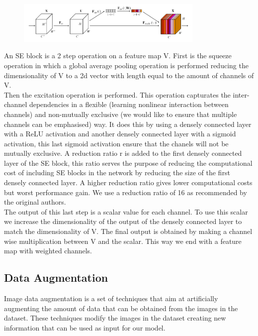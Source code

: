 \documentclass[runningheads,a4paper]{llncs}
\begin{document}
\begin{figure}[H]
    \centering
    \includegraphics[width=0.8\textwidth]{background/se.png}
    \caption{}
    \label{figure:background:se}
\end{figure}

An SE block is a 2 step operation on a feature map V. First is the squeeze operation in which a global average pooling operation is performed reducing the dimensionality of V to a 2d vector with length equal to the amount of channels of V. \\

Then the excitation operation is performed. This operation capturates the inter-channel dependencies in a flexible (learning nonlinear interaction between channels) and non-mutually exclusive (we would like to ensure that multiple channels can be emphasised) way. It does this by using a densely connected layer with a ReLU activation and another densely connected layer with a sigmoid activation, this last sigmoid activation ensure that the chanels will not be mutually exclusive. A reduction ratio r is added to the first densely connected layer of the SE block, this ratio serves the purpose of reducing the computational cost of including SE blocks in the network by reducing the size of the first densely connected layer. A higher reduction ratio gives lower computational costs but worst performance gain. We use a reduction ratio of 16 as recommended by the original authors. \\

The output of this last step is a scalar value for each channel. To use this scalar we increase the dimensionality of the output of the densely connected layer to match the dimensionality of V. The final output is obtained by making a channel wise multiplication between V and the scalar. This way we end with a feature map with weighted channels.

\subsection{Data Augmentation}

Image data augmentation is a set of techniques that aim at artificially augmenting the amount of data that can be obtained from the images in the dataset.  These techniques modify the images in the dataset creating new information that can be used as input for our model. \\
\end{document}
